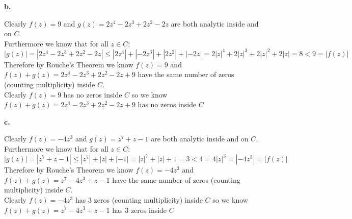 \documentclass{article}
\begin{document}
{\Large\textbf{b.}}
\begin{center}
    \doublespacing
    Clearly $f(z) = 9$ and $g(z) = 2z^4 - 2z^3 + 2z^2 - 2z$ are both analytic inside and on $C$.
    \\Furthermore we know that for all $z\in C$:
    \\$|g(z)| = |2z^4 - 2z^3 + 2z^2 - 2z|\leq |2z^4| + |-2z^3| + |2z^2| + |-2z| = 2|z|^4 + 2|z|^3 + 2|z|^2 + 2|z| = 8 < 9 = |f(z)|$
    \\Therefore by Rouche's Theorem we know $f(z) = 9$ and $f(z) + g(z) = 2z^4 - 2z^3 + 2z^2 - 2z + 9$ have the same number of zeros (counting multiplicity) inside $C$.
    \\Clearly $f(z) = 9$ has no zeros inside $C$ so we know $f(z) + g(z) = 2z^4 - 2z^3 + 2z^2 - 2z + 9$ has no zeros inside $C$ \qedsymbol
\end{center}

{\Large\textbf{c.}}
\begin{center}
    \doublespacing
    Clearly $f(z) = -4z^3$ and $g(z) = z^7 + z - 1$ are both analytic inside and on $C$.
    \\Furthermore we know that for all $z\in C$:
    \\$|g(z)| = |z^7 + z - 1|\leq |z^7| + |z| + |-1| = |z|^7 + |z| + 1 = 3 < 4 = 4|z|^3 = |-4z^3| = |f(z)|$
    \\Therefore by Rouche's Theorem we know $f(z) = -4z^3$ and $f(z) + g(z) = z^7 - 4z^3 + z - 1$ have the same number of zeros (counting multiplicity) inside $C$.
    \\Clearly $f(z) = -4z^3$ has 3 zeros (counting multiplicity) inside $C$ so we know $f(z) + g(z) = z^7 - 4z^3 + z - 1$ has 3 zeros inside $C$ \qedsymbol
\end{center}


\newpage
\end{document}
